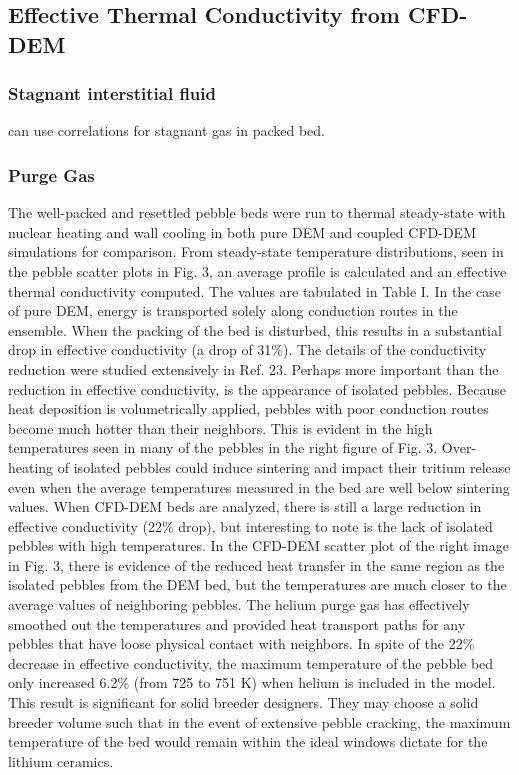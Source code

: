 \subsection{Effective Thermal Conductivity from CFD-DEM}\label{sec:cfd-dem-effective-conductivity}

\subsubsection{Stagnant interstitial fluid}
can use correlations for stagnant gas in packed bed.



\subsubsection{Purge Gas}
The well-packed and resettled pebble beds were run to thermal steady-state with nuclear heating and wall cooling in both pure DEM and coupled CFD-DEM simulations for comparison. From steady-state temperature distributions, seen in the pebble scatter plots in Fig. 3, an average profile is calculated and an effective thermal conductivity computed. The values are tabulated in Table I. 
In the case of pure DEM, energy is transported solely along conduction routes in the ensemble. When the packing of the bed is disturbed, this results in a substantial drop in effective conductivity (a drop of 31\%). The details of the conductivity reduction were studied extensively in Ref. 23. Perhaps more important than the reduction in effective conductivity, is the appearance of isolated pebbles. Because heat deposition is volumetrically applied, pebbles with poor conduction routes become much hotter than their neighbors. This is evident in the high temperatures seen in many of the pebbles in the right figure of Fig. 3. Over-heating of isolated pebbles could induce sintering and impact their tritium release even when the average temperatures measured in the bed are well below sintering values.
When CFD-DEM beds are analyzed, there is still a large reduction in effective conductivity (22\% drop), but interesting to note is the lack of isolated pebbles with high temperatures. In the CFD-DEM scatter plot of the right image in Fig. 3, there is evidence of the reduced heat transfer in the same region as the isolated pebbles from the DEM bed, but the temperatures are much closer to the average values of neighboring pebbles. The helium purge gas has effectively smoothed out the temperatures and provided heat transport paths for any pebbles that have loose physical contact with neighbors.
In spite of the 22\% decrease in effective conductivity, the maximum temperature of the pebble bed only increased 6.2\% (from 725 to 751 K) when helium is included in the model. This result is significant for solid breeder designers. They may choose a solid breeder volume such that in the event of extensive pebble cracking, the maximum temperature of the bed would remain within the ideal windows dictate for the lithium ceramics.

